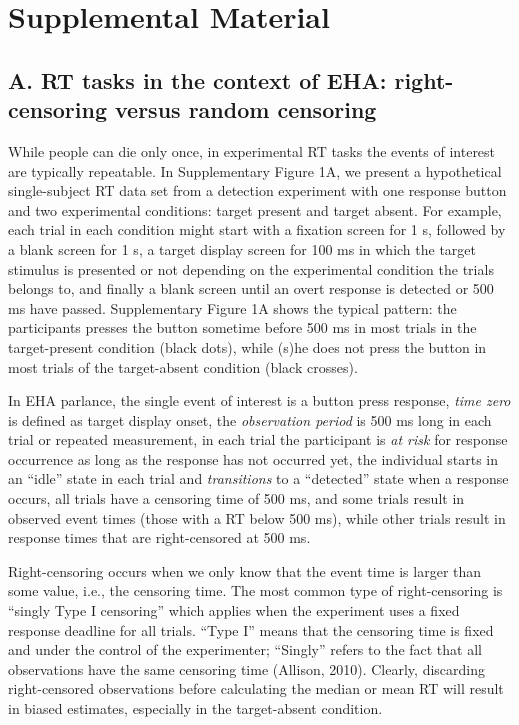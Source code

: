\documentclass[
  man,floatsintext]{apa6}
\author{\phantom{0}}
\date{}
\affiliation{\phantom{0}}
\begin{document}
\renewcommand{\figurename}{Supplementary Figure}
\renewcommand{\tablename}{Supplemetentary Table}

\section{Supplemental Material}\label{supplemental-material}

\subsection{A. RT tasks in the context of EHA: right-censoring versus random censoring}\label{a.-rt-tasks-in-the-context-of-eha-right-censoring-versus-random-censoring}

While people can die only once, in experimental RT tasks the events of interest are typically repeatable. In Supplementary Figure 1A, we present a hypothetical single-subject RT data set from a detection experiment with one response button and two experimental conditions: target present and target absent. For example, each trial in each condition might start with a fixation screen for 1 s, followed by a blank screen for 1 s, a target display screen for 100 ms in which the target stimulus is presented or not depending on the experimental condition the trials belongs to, and finally a blank screen until an overt response is detected or 500 ms have passed. Supplementary Figure 1A shows the typical pattern: the participants presses the button sometime before 500 ms in most trials in the target-present condition (black dots), while (s)he does not press the button in most trials of the target-absent condition (black crosses).

In EHA parlance, the single event of interest is a button press response, \emph{time zero} is defined as target display onset, the \emph{observation period} is 500 ms long in each trial or repeated measurement, in each trial the participant is \emph{at risk} for response occurrence as long as the response has not occurred yet, the individual starts in an ``idle'' state in each trial and \emph{transitions} to a ``detected'' state when a response occurs, all trials have a censoring time of 500 ms, and some trials result in observed event times (those with a RT below 500 ms), while other trials result in response times that are right-censored at 500 ms.

Right-censoring occurs when we only know that the event time is larger than some value, i.e., the censoring time. The most common type of right-censoring is ``singly Type I censoring'' which applies when the experiment uses a fixed response deadline for all trials. ``Type I'' means that the censoring time is fixed and under the control of the experimenter; ``Singly'' refers to the fact that all observations have the same censoring time (Allison, 2010). Clearly, discarding right-censored observations before calculating the median or mean RT will result in biased estimates, especially in the target-absent condition.
\end{document}
